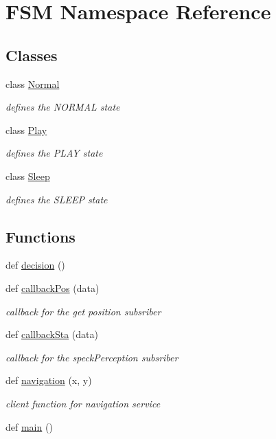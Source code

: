 \hypertarget{namespaceFSM}{}\section{F\+SM Namespace Reference}
\label{namespaceFSM}
\subsection*{Classes}
\begin{DoxyCompactItemize}
\item 
class \hyperlink{classFSM_1_1Normal}{Normal}
\begin{DoxyCompactList}\small\item\em defines the N\+O\+R\+M\+AL state \end{DoxyCompactList}\item 
class \hyperlink{classFSM_1_1Play}{Play}
\begin{DoxyCompactList}\small\item\em defines the P\+L\+AY state \end{DoxyCompactList}\item 
class \hyperlink{classFSM_1_1Sleep}{Sleep}
\begin{DoxyCompactList}\small\item\em defines the S\+L\+E\+EP state \end{DoxyCompactList}\end{DoxyCompactItemize}
\subsection*{Functions}
\begin{DoxyCompactItemize}
\item 
def \hyperlink{namespaceFSM_af260b27c59635079f8b07d91369570b5}{decision} ()
\item 
def \hyperlink{namespaceFSM_a4f42463821520598ea44b0ae6acfc327}{callback\+Pos} (data)
\begin{DoxyCompactList}\small\item\em callback for the get position subsriber \end{DoxyCompactList}\item 
def \hyperlink{namespaceFSM_a3f1960947f6a0dbcf41a5a97e18876b0}{callback\+Sta} (data)
\begin{DoxyCompactList}\small\item\em callback for the speck\+Perception subsriber \end{DoxyCompactList}\item 
def \hyperlink{namespaceFSM_abb847a793996f13624334054ad5eb37c}{navigation} (x, y)
\begin{DoxyCompactList}\small\item\em client function for navigation service \end{DoxyCompactList}\item 
def \hyperlink{namespaceFSM_acc99b577ee61be1b7cc0e2baae140224}{main} ()
\end{DoxyCompactItemize}
